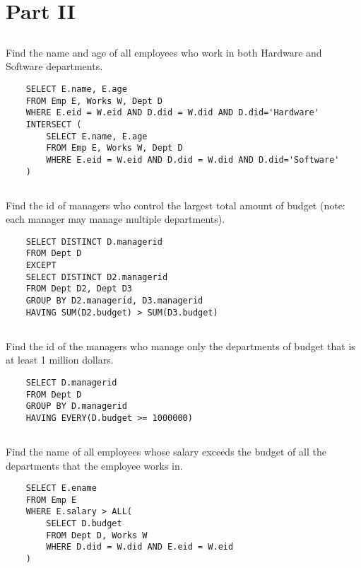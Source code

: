 \documentclass{article}
\begin{document}
\section{Part II}
\subsection{}
Find the name and age of all employees who work in both Hardware and Software departments.
\begin{verbatim}
    SELECT E.name, E.age
    FROM Emp E, Works W, Dept D
    WHERE E.eid = W.eid AND D.did = W.did AND D.did='Hardware'
    INTERSECT (   
        SELECT E.name, E.age
        FROM Emp E, Works W, Dept D
        WHERE E.eid = W.eid AND D.did = W.did AND D.did='Software'
    )
\end{verbatim}

\subsection{}
Find the id of managers who control the largest total amount of budget (note: each manager may manage multiple departments).
\begin{verbatim}
    SELECT DISTINCT D.managerid
    FROM Dept D
    EXCEPT
    SELECT DISTINCT D2.managerid
    FROM Dept D2, Dept D3
    GROUP BY D2.managerid, D3.managerid
    HAVING SUM(D2.budget) > SUM(D3.budget)
\end{verbatim}

\subsection{}
Find the id of the managers who manage only the departments of budget that is at least 1 million dollars.
\begin{verbatim}
    SELECT D.managerid
    FROM Dept D
    GROUP BY D.managerid 
    HAVING EVERY(D.budget >= 1000000)
\end{verbatim}

\subsection{}
Find the name of all employees whose salary exceeds the budget of all the departments that the employee works in.
\begin{verbatim}
    SELECT E.ename
    FROM Emp E
    WHERE E.salary > ALL(
        SELECT D.budget 
        FROM Dept D, Works W 
        WHERE D.did = W.did AND E.eid = W.eid
    )
\end{verbatim}
\end{document}
